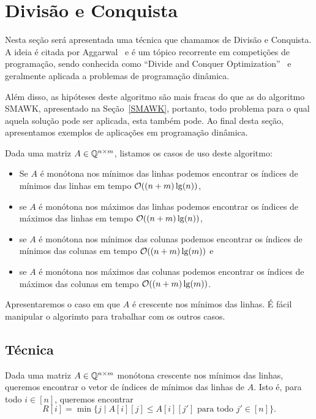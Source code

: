 \section{Divisão e Conquista}
\label{DivConq}


Nesta seção será apresentada uma técnica que chamamos de Divisão e Conquista. A ideia é citada por Aggarwal~\cite{Aggarwal:1987} e é um tópico recorrente em competições de programação, sendo conhecida como ``Divide and Conquer Optimization''~\cite{Quora:DivConq,CF:Optm} e geralmente aplicada a problemas de programação dinâmica. 

Além disso, as hipóteses deste algoritmo são mais fracas do que as do algoritmo SMAWK, apresentado na Seção~\ref{SMAWK}, portanto, todo problema para o qual aquela solução pode ser aplicada, esta também pode. Ao final desta seção, apresentamos exemplos de aplicações em programação dinâmica.  

Dada uma matriz $A \in \mathbb{Q}^{n \times m}$, listamos os casos de uso deste algoritmo:
\begin{itemize}
    \item Se $A$ é monótona nos mínimos das linhas podemos encontrar os índices de mínimos das linhas em tempo $\mathcal{O}((n+m)\lg(n))$, 
    \item se $A$ é monótona nos máximos das linhas podemos encontrar os índices de máximos das linhas em tempo $\mathcal{O}((n+m)\lg(n))$, 
    \item se $A$ é monótona nos mínimos das colunas podemos encontrar os índices de mínimos das colunas em tempo $\mathcal{O}((n+m)\lg(m))$ e 
    \item se $A$ é monótona nos máximos das colunas podemos encontrar os índices de máximos das colunas em tempo $\mathcal{O}((n+m)\lg(m))$.
\end{itemize}

Apresentaremos o caso em que $A$ é crescente nos mínimos das linhas. É fácil manipular o algorimto para trabalhar com os outros casos.


\subsection{Técnica}
Dada uma matriz $A \in \mathbb{Q}^{n \times m}$ monótona crescente nos mínimos das linhas, queremos encontrar o vetor de índices de mínimos das linhas de $A$. Isto é, para todo $i \in [n]$, queremos encontrar
$$ R[i] = \min\{j \mid A[i][j] \leq A[i][j'] \text{ para todo } j' \in [n]\} \text{.}$$  

